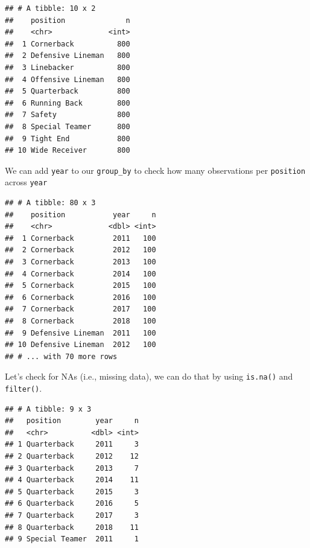 \documentclass[
]{book}
\newenvironment{Shaded}{\begin{snugshade}}{\end{snugshade}}
\newcommand{\KeywordTok}[1]{\textcolor[rgb]{0.13,0.29,0.53}{\textbf{#1}}}
\newcommand{\NormalTok}[1]{#1}
\newcommand{\OperatorTok}[1]{\textcolor[rgb]{0.81,0.36,0.00}{\textbf{#1}}}
\newcommand{\StringTok}[1]{\textcolor[rgb]{0.31,0.60,0.02}{#1}}
\begin{document}
\begin{verbatim}
## # A tibble: 10 x 2
##    position              n
##    <chr>             <int>
##  1 Cornerback          800
##  2 Defensive Lineman   800
##  3 Linebacker          800
##  4 Offensive Lineman   800
##  5 Quarterback         800
##  6 Running Back        800
##  7 Safety              800
##  8 Special Teamer      800
##  9 Tight End           800
## 10 Wide Receiver       800
\end{verbatim}

We can add \texttt{year} to our \texttt{group\_by} to check how many observations per \texttt{position} across \texttt{year}

\begin{Shaded}
\end{Shaded}

\begin{verbatim}
## # A tibble: 80 x 3
##    position           year     n
##    <chr>             <dbl> <int>
##  1 Cornerback         2011   100
##  2 Cornerback         2012   100
##  3 Cornerback         2013   100
##  4 Cornerback         2014   100
##  5 Cornerback         2015   100
##  6 Cornerback         2016   100
##  7 Cornerback         2017   100
##  8 Cornerback         2018   100
##  9 Defensive Lineman  2011   100
## 10 Defensive Lineman  2012   100
## # ... with 70 more rows
\end{verbatim}

Let's check for NAs (i.e., missing data), we can do that by using \texttt{is.na()} and \texttt{filter()}.

\begin{Shaded}
\end{Shaded}

\begin{verbatim}
## # A tibble: 9 x 3
##   position        year     n
##   <chr>          <dbl> <int>
## 1 Quarterback     2011     3
## 2 Quarterback     2012    12
## 3 Quarterback     2013     7
## 4 Quarterback     2014    11
## 5 Quarterback     2015     3
## 6 Quarterback     2016     5
## 7 Quarterback     2017     3
## 8 Quarterback     2018    11
## 9 Special Teamer  2011     1
\end{verbatim}
\end{document}
